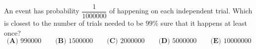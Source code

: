 An event has probability $\dfrac{1}{1000000}$ of happening on each independent trial. Which is closest to the number of trials needed to be $99\%$ sure that it happens at least once?
\[\textbf{(A) }990000\qquad\textbf{(B) }1500000\qquad\textbf{(C) }2000000\qquad\textbf{(D) }5000000\qquad\textbf{(E) }10000000\]
